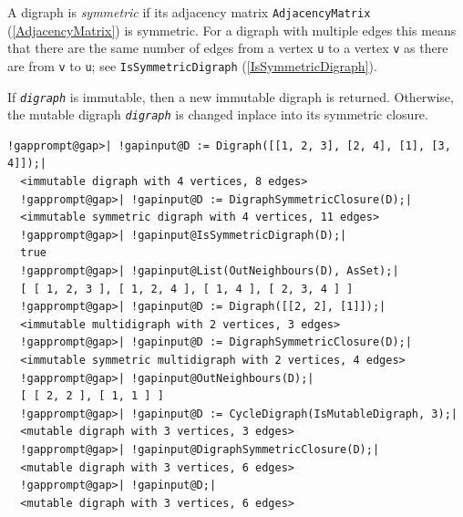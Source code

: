 \documentclass[a4paper,11pt]{report}
\begin{document}
{{{ A digraph is \emph{symmetric} if its adjacency matrix \texttt{AdjacencyMatrix} (\ref{AdjacencyMatrix}) is symmetric. For a digraph with multiple edges this means that there are the
same number of edges from a vertex \texttt{u} to a vertex \texttt{v} as there are from \texttt{v} to \texttt{u}; see \texttt{IsSymmetricDigraph} (\ref{IsSymmetricDigraph}).

 If \mbox{\texttt{\mdseries\slshape digraph}} is immutable, then a new immutable digraph is returned. Otherwise, the mutable
digraph \mbox{\texttt{\mdseries\slshape digraph}} is changed in\texttt{}place into its symmetric closure. 
\begin{Verbatim}[commandchars=!@|,fontsize=\small,frame=single,label=Example]
  !gapprompt@gap>| !gapinput@D := Digraph([[1, 2, 3], [2, 4], [1], [3, 4]]);|
  <immutable digraph with 4 vertices, 8 edges>
  !gapprompt@gap>| !gapinput@D := DigraphSymmetricClosure(D);|
  <immutable symmetric digraph with 4 vertices, 11 edges>
  !gapprompt@gap>| !gapinput@IsSymmetricDigraph(D);|
  true
  !gapprompt@gap>| !gapinput@List(OutNeighbours(D), AsSet);|
  [ [ 1, 2, 3 ], [ 1, 2, 4 ], [ 1, 4 ], [ 2, 3, 4 ] ]
  !gapprompt@gap>| !gapinput@D := Digraph([[2, 2], [1]]);|
  <immutable multidigraph with 2 vertices, 3 edges>
  !gapprompt@gap>| !gapinput@D := DigraphSymmetricClosure(D);|
  <immutable symmetric multidigraph with 2 vertices, 4 edges>
  !gapprompt@gap>| !gapinput@OutNeighbours(D);|
  [ [ 2, 2 ], [ 1, 1 ] ]
  !gapprompt@gap>| !gapinput@D := CycleDigraph(IsMutableDigraph, 3);|
  <mutable digraph with 3 vertices, 3 edges>
  !gapprompt@gap>| !gapinput@DigraphSymmetricClosure(D);|
  <mutable digraph with 3 vertices, 6 edges>
  !gapprompt@gap>| !gapinput@D;|
  <mutable digraph with 3 vertices, 6 edges>
\end{Verbatim}
 }

 

}}
\end{document}
